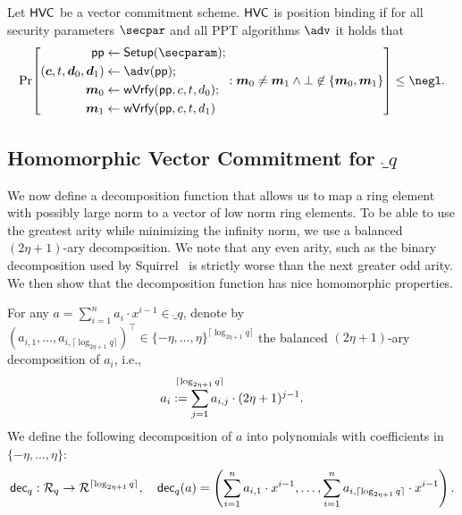 \begin{definition}
  Let $\mathsf{HVC}$ be a vector commitment scheme.
  $\mathsf{HVC}$ is position binding if for all security parameters $\secpar$ and all PPT algorithms $\adv$ it holds that
  \[
    \Pr\mleft[
      \begin{aligned}
      \params\gets{}&\setup(\secparam);\\
      (\vec{c},t,\vec{d}_0,\vec{d}_1) \gets{}& \adv(\params);\\
      \vec{m}_0 \gets{}& \wverify(\params,c,t,d_0);\\
      \vec{m}_1 \gets{}& \wverify(\params,c,t,d_1)
      \end{aligned}:
      \vec{m}_0\neq \vec{m}_1 \land \bot\not\in\{\vec{m}_0,\vec{m}_1\}
    \mright]\leq \negl.
  \]
\end{definition}


\subsection{Homomorphic Vector Commitment for $\ring_q$}

We now define a decomposition function that allows us to map a ring element with possibly large norm to a vector of low norm ring elements.
To be able to use the greatest arity while minimizing the infinity norm, we use a balanced $(2\eta+1)$-ary decomposition.
We note that any even arity, such as the binary decomposition used by Squirrel~\cite{CCS:FleSimZha22} is strictly worse than the next greater odd arity.
We then show that the decomposition function has nice homomorphic properties.
\begin{definition}
    For any $a = \sum_{i=1}^{n} a_i\cdot x^{i-1}  \in \ring_q$,
    denote by $(a_{i,1},\dots,a_{i,\lceil \log_{2\eta+1} q \rceil})^\intercal\in \{-\eta,\dots,\eta\}^{\lceil\log_{2\eta+1} q\rceil}$ the balanced $(2\eta+1)$-ary decomposition of $a_i$, i.e.,
    \[a_{i} := \smashoperator{\sum_{j=1}^{\lceil\log_{2\eta+1} q\rceil}} a_{i,j}\cdot (2\eta+1)^{j-1}.\]
    We define the following decomposition of $a$ into polynomials with coefficients in $\{-\eta,\dots,\eta\}$:
    \begin{equation*}
        \mathsf{dec}_q: \mathcal{R}_q \to \mathcal{R}^{\lceil\log_{2\eta+1} q\rceil},\quad
        \mathsf{dec}_q(a) = \left(\sum_{i=1}^{n} a_{i,1}\cdot x^{i-1}, \dots, \sum_{i=1}^{n} a_{i,\lceil\log_{2\eta+1} q\rceil}\cdot x^{i-1} \right).
    \end{equation*}
\end{definition}

